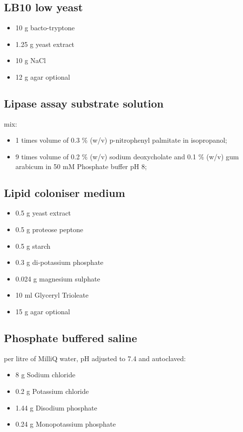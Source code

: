 \documentclass[11pt]{article}
\begin{document}
\subsection{LB10 low yeast}
\begin{itemize}
\item 10 g bacto-tryptone
\item 1.25 g yeast extract
\item 10 g NaCl
\item 12 g agar optional
\end{itemize}

\subsection{Lipase assay substrate solution}
mix:
\begin{itemize}
\item 1 times volume of 0.3 \% (w/v) p-nitrophenyl palmitate in isopropanol;
\item 9 times volume of 0.2 \% (w/v) sodium deoxycholate and 0.1 \% (w/v) gum arabicum in 50 mM Phosphate buffer pH 8;
\end{itemize}

\subsection{Lipid coloniser medium}
\begin{itemize}
\item 0.5 g yeast extract
\item 0.5 g proteose peptone
\item 0.5 g starch
\item 0.3 g di-potassium phosphate
\item 0.024 g magnesium sulphate
\item 10 ml Glyceryl Trioleate
\item 15 g agar optional
\end{itemize}

\subsection{Phosphate buffered saline}
per litre of MilliQ water, pH adjusted to 7.4 and autoclaved:
\begin{itemize}
\item 8 g Sodium chloride
\item 0.2 g Potassium chloride
\item 1.44 g Disodium phosphate
\item 0.24 g Monopotassium phosphate
\end{itemize}
\end{document}
